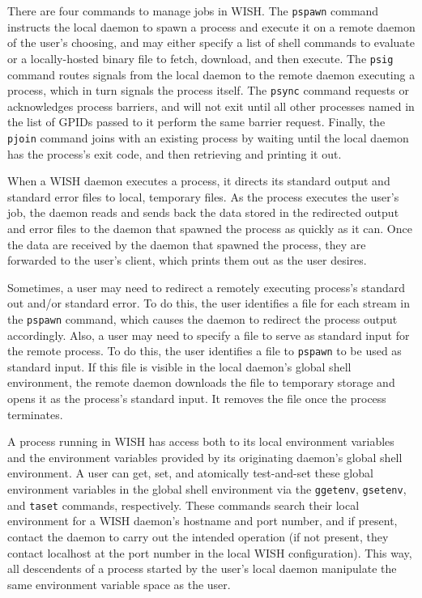 There are four commands to manage jobs in WISH.  The \texttt{pspawn} command
instructs the local daemon to spawn a process and execute it on a remote
daemon of the user's choosing, and may either specify a list of shell commands
to evaluate or a locally-hosted binary file to fetch, download, and then
execute.  The \texttt{psig} command routes signals from the local daemon to
the remote daemon executing a process, which in turn signals the process
itself.  The \texttt{psync} command requests or acknowledges process barriers,
and will not exit until all other processes named in the list of GPIDs passed
to it perform the same barrier request.  Finally, the \texttt{pjoin} command
joins with an existing process by waiting until the local daemon has the
process's exit code, and then retrieving and printing it out.


When a WISH daemon executes a process, it directs its standard output and
standard error files to local, temporary files.  As the process executes the
user's job, the daemon reads and sends back the data stored in the redirected
output and error files to the daemon that spawned the process as quickly as it
can.  Once the data are received by the daemon that spawned the process, they
are forwarded to the user's client, which prints them out as the user desires.

Sometimes, a user may need to redirect a remotely executing process's standard
out and/or standard error.  To do this, the user identifies a file for each
stream in the \texttt{pspawn} command, which causes the daemon to redirect the
process output accordingly.  Also, a user may need to specify a file to serve
as standard input for the remote process.  To do this, the user identifies a
file to \texttt{pspawn} to be used as standard input.  If this file is visible
in the local daemon's global shell environment, the remote daemon downloads
the file to temporary storage and opens it as the process's standard input.
It removes the file once the process terminates.


A process running in WISH has access both to its local environment variables
and the environment variables provided by its originating daemon's global
shell environment.  A user can get, set, and atomically test-and-set these
global environment variables in the global shell environment via the
\texttt{ggetenv}, \texttt{gsetenv}, and \texttt{taset} commands, respectively.
These commands search their local environment for a WISH daemon's hostname and
port number, and if present, contact the daemon to carry out the intended
operation (if not present, they contact localhost at the port number in the
local WISH configuration).  This way, all descendents of a process started by
the user's local daemon manipulate the same environment variable space as the
user.

